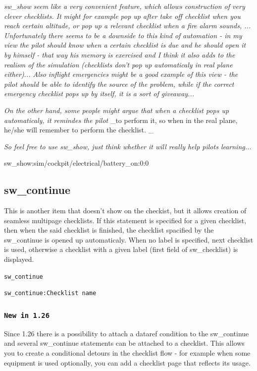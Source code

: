 \documentclass[11pt,parskip=half,a4paper]{scrartcl}
\newcommand\textstyleSourceText[1]{\texttt{#1}}
\newcommand\textstyleEmphasis[1]{\textit{#1}}
\begin{document}
\textstyleEmphasis{sw\_show seem like a very convenient feature, which allows construction of very clever checklists. It} \textstyleEmphasis{might for example pop up after take off checklist when you reach certain altitude, or pop up a relevant} \textstyleEmphasis{checklist when a fire alarm sounds, ... Unfortunately there seems to be a downside to this kind of} \textstyleEmphasis{automation - in my view the pilot should know when a certain checklist is due and he should open it} \textstyleEmphasis{by himself - that way his memory is exercised and I think it also adds to the realism of the simulation} \textstyleEmphasis{(checklists don't pop up automaticaly in real plane either)... Also inflight emergencies might be a good} \textstyleEmphasis{example of this view - the pilot should be able to identify the source of the problem, while if the correct} \textstyleEmphasis{emergency checklist pops up by itself, it is a sort of
giveaway...}

\textstyleEmphasis{On the other hand, some people might argue that when a checklist pops up automaticaly, it remindes the pilot} \_to perform it, so when in the real plane, he/she will remember to perform the checklist. \_

\textstyleEmphasis{So feel free to use sw\_show, just think whether it will really help pilots learning...}

sw\_show:sim/cockpit/electrical/battery\_on:0:0


\subsection[sw\_continue]{sw\_continue}
This is another item that doesn't show on the checkist, but it allows creation of {\textquotedbl}seamless{\textquotedbl}
multipage checklists. If this statement is specified for a given checklist, then when the said checklist is finished, the checklist spacified by the sw\_continue is opened up automaticaly. When no label is specified, next checklist is used, otherwise a checklist with a given label (first field of sw\_checklist) is displayed.

\textstyleSourceText{sw\_continue}

\textstyleSourceText{sw\_continue:Checklist name}

\subsubsection[New in 1.26]{\textstyleSourceText{New in 1.26}}
Since 1.26 there is a possibility to attach a dataref condition to the sw\_continue and several sw\_continue statements can be attached to a checklist. This allows you to create a conditional {\textquotedbl}detours{\textquotedbl} in the checklist flow - for example when some equipment is used optionally, you can add a checklist page that reflects its usage.
\end{document}

